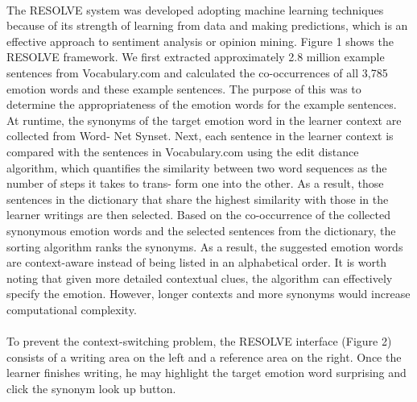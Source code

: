 \documentclass[a4paper,12pt,oneside]{article}
\begin{document}
\paragraph{}
The RESOLVE system was developed adopting machine learning techniques because of its strength of learning from data and making predictions, which is an effective approach to sentiment analysis or opinion mining. Figure 1 shows the RESOLVE framework. We first extracted approximately 2.8 million example sentences from Vocabulary.com and calculated the co-occurrences of all 3,785 emotion words and these example sentences. The purpose of this was to determine the appropriateness of the emotion words for the example sentences. At runtime, the synonyms of the target emotion word in the learner context are collected from Word- Net Synset. Next, each sentence in the learner context is compared with the sentences in Vocabulary.com using the edit distance algorithm, which quantifies the similarity between two word sequences as the number of steps it takes to trans- form one into the other. As a result, those sentences in the dictionary that share the highest similarity with those in the learner writings are then selected. Based on the co-occurrence of the collected synonymous emotion words and the selected sentences from the dictionary, the sorting algorithm ranks the synonyms. As a result, the suggested emotion words are context-aware instead of being listed in an alphabetical order. It is worth noting that given more detailed contextual clues, the algorithm can effectively specify the emotion. However, longer contexts and more synonyms would increase computational complexity. 
\paragraph{}
To prevent the context-switching problem, the RESOLVE interface (Figure 2) consists of a writing area on the left and a reference area on the right. Once the learner finishes writing, he may highlight the target emotion word surprising and click the synonym look up button.
\end{document}

